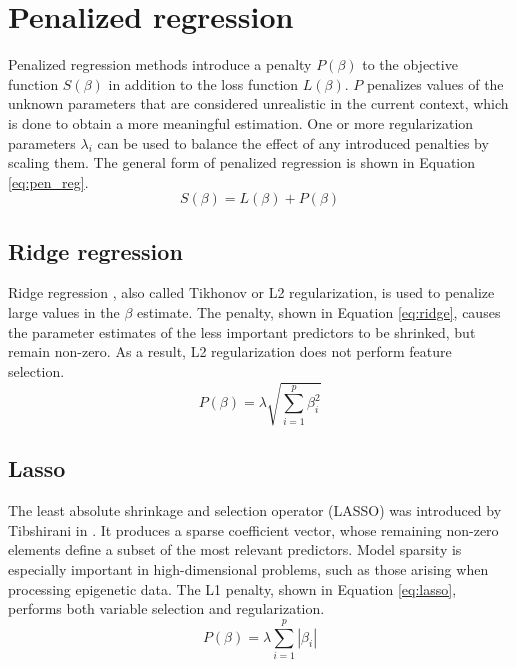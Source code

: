 \section{Penalized regression} \label{sec:pen_reg}
Penalized regression methods introduce a penalty $P(\beta)$ to the objective function $S(\beta)$ in addition to the loss function $L(\beta)$. $P$ penalizes values of the unknown parameters that are considered unrealistic in the current context, which is done to obtain a more meaningful estimation. One or more regularization parameters $\lambda_i$ can be used to balance the effect of any introduced penalties by scaling them. The general form of penalized regression is shown in Equation \ref{eq:pen_reg}. 
\begin{equation} \label{eq:pen_reg}
S(\beta) = L(\beta) + P(\beta)
\end{equation}


\subsection{Ridge regression} \label{sec:ridge}
Ridge regression \cite{hoerl1970ridge}, also called Tikhonov or L2 regularization, is used to penalize large values in the $\beta$ estimate. The penalty, shown in Equation \ref{eq:ridge}, causes the parameter estimates of the less important predictors to be shrinked, but remain non-zero. As a result, L2 regularization does not perform feature selection.
\begin{equation} \label{eq:ridge}
P(\beta) = \lambda\sqrt{\sum_{i=1}^{p}\beta_i^2}
\end{equation}


\subsection{Lasso} \label{sec:lasso}
The least absolute shrinkage and selection operator (LASSO) was introduced by Tibshirani in \cite{tibshirani1996regression}. It produces a sparse coefficient vector, whose remaining non-zero elements define a subset of the most relevant predictors. Model sparsity is especially important in high-dimensional problems, such as those arising when processing epigenetic data. The L1 penalty, shown in Equation \ref{eq:lasso}, performs both variable selection and regularization.
\begin{equation} \label{eq:lasso}
P(\beta) = \lambda\sum_{i=1}^{p}\left|\beta_i\right|
\end{equation}


